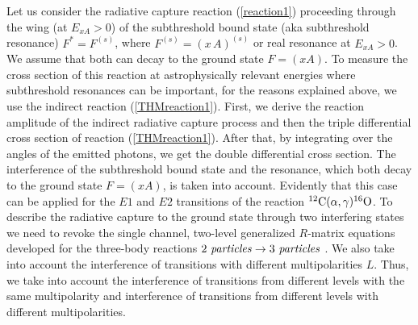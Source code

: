 \documentclass[prl,unsortedaddress,groupedaddress,twocolumn,amsmath,amsfonts,amssymb,showpacs,floatfix,nofootinbib]{revtex4}
\begin{document}
Let us consider the radiative capture reaction  (\ref{reaction1}) proceeding through the wing (at $E_{xA} >0$) of the subthreshold bound state (aka subthreshold resonance) $F^{*} = F^{(s)}$, where  $F^{(s)} =(x\,A)^{(s)}$ or real resonance at $E_{xA} >0$. We assume that both can decay to the ground state $F=(xA)$. To measure the cross section of this reaction at astrophysically relevant energies where subthreshold resonances can be important, for the reasons explained above,  we  use the indirect reaction (\ref{THMreaction1}).
First, we derive the reaction amplitude of the indirect radiative capture process and then the triple differential cross section of reaction (\ref{THMreaction1}). After that, by integrating over the angles of the emitted photons, we get the double differential cross section.
The interference of  the subthreshold bound state and the resonance, which both decay to the ground state
$F=(xA)$, is taken into account. Evidently that this case can be applied for the $E1$ and $E2$ transitions of the reaction ${}^{12}{\rm C}(\alpha,\gamma){}^{16}{\rm O}$.
To describe the radiative capture to the ground state through two interfering states  we need to revoke the single channel, two-level generalized $R$-matrix equations developed for the three-body reactions $2\,\,{\it particles} \to 3\,\,{\it particles}$ \cite{reviewpaper,muk2011}.  
We also take into account the interference of transitions with different multipolarities $L$. Thus, we take into account the interference of transitions from different levels with the same multipolarity and interference of transitions from different levels with different multipolarities.  
\end{document}
